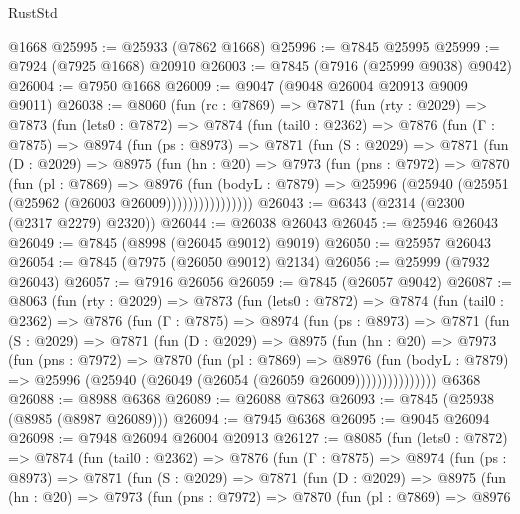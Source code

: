 \begin{lexlean}{RustStd}
\begin{coremodule}
    @1668
@25995 := @25933 (@7862 @1668)
@25996 := @7845 @25995
@25999 := @7924 (@7925 @1668) @20910
@26003 := @7845 (@7916 (@25999 @9038) @9042)
@26004 := @7950 @1668
@26009 := @9047 (@9048 @26004 @20913 @9009 @9011)
@26038 := @8060
    (fun (rc : @7869) =>
    @7871
      (fun (rty : @2029) =>
      @7873
        (fun (lets0 : @7872) =>
        @7874
          (fun (tail0 : @2362) =>
          @7876
            (fun (Γ : @7875) =>
            @8974
              (fun (ps : @8973) =>
              @7871
                (fun (S : @2029) =>
                @7871
                  (fun (D : @2029) =>
                  @8975
                    (fun (hn : @20) =>
                    @7973
                      (fun (pns : @7972) =>
                      @7870
                        (fun (pl : @7869) =>
                        @8976
                          (fun (bodyL : @7879) =>
                          @25996 (@25940 (@25951 (@25962 (@26003 @26009))))))))))))))))
@26043 := @6343 (@2314 (@2300 (@2317 @2279) @2320))
@26044 := @26038 @26043
@26045 := @25946 @26043
@26049 := @7845 (@8998 (@26045 @9012) @9019)
@26050 := @25957 @26043
@26054 := @7845 (@7975 (@26050 @9012) @2134)
@26056 := @25999 (@7932 @26043)
@26057 := @7916 @26056
@26059 := @7845 (@26057 @9042)
@26087 := @8063
    (fun (rty : @2029) =>
    @7873
      (fun (lets0 : @7872) =>
      @7874
        (fun (tail0 : @2362) =>
        @7876
          (fun (Γ : @7875) =>
          @8974
            (fun (ps : @8973) =>
            @7871
              (fun (S : @2029) =>
              @7871
                (fun (D : @2029) =>
                @8975
                  (fun (hn : @20) =>
                  @7973
                    (fun (pns : @7972) =>
                    @7870
                      (fun (pl : @7869) =>
                      @8976
                        (fun (bodyL : @7879) =>
                        @25996 (@25940 (@26049 (@26054 (@26059 @26009)))))))))))))))
    @6368
@26088 := @8988 @6368
@26089 := @26088 @7863
@26093 := @7845 (@25938 (@8985 (@8987 @26089)))
@26094 := @7945 @6368
@26095 := @9045 @26094
@26098 := @7948 @26094 @26004 @20913
@26127 := @8085
    (fun (lets0 : @7872) =>
    @7874
      (fun (tail0 : @2362) =>
      @7876
        (fun (Γ : @7875) =>
        @8974
          (fun (ps : @8973) =>
          @7871
            (fun (S : @2029) =>
            @7871
              (fun (D : @2029) =>
              @8975
                (fun (hn : @20) =>
                @7973
                  (fun (pns : @7972) =>
                  @7870
                    (fun (pl : @7869) =>
                    @8976

\end{coremodule}
\end{lexlean}
